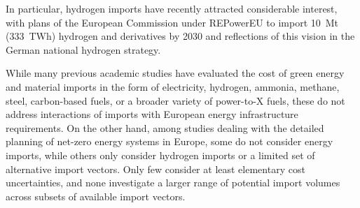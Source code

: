 

In particular, hydrogen imports have recently attracted considerable interest,
with plans of the European Commission under
\mbox{REPowerEU}\cite{europeancommissionRepowerEUPlan} to import 10~Mt (333~TWh)
hydrogen and derivatives by 2030 and reflections of this vision in the German
national hydrogen
strategy.\cite{bundesministeriumfuerwirtschaftundklimaschutzFortschreibungNationalen2023}



While many previous academic studies have evaluated the cost of green energy and material imports in the form of
electricity,\cite{lilliestamEnergySecurity2011,triebSolarElectricity2012,lilliestamVulnerabilityTerrorist2014,bogdanovNorthEastAsian2016,benaslaTransitionSustainable2019,reichenbergDeepDecarbonization2022}%
hydrogen,\cite{timmerbergHydrogenRenewables2019,ishimotoLargescaleProduction2020,brandleEstimatingLongterm2021,luxSupplyCurves2021,galvanExportingSunshine2022,collisDeterminingProduction2022,galimovaImpactInternational2023}
ammonia,\cite{nayak-lukeTechnoeconomicViability2020,armijoFlexibleProduction2020,galimovaFeasibilityGreen2023}
methane,\cite{luxSupplyCurves2021,agoraenergiewendeHydrogenImport2022}
steel,\cite{trollipHowGreen2022a,devlinRegionalSupply2022,lopezDefossilisedSteel2023}
carbon-based
fuels,\cite{fasihiLongTermHydrocarbon2017,sherwinElectrofuelSynthesis2021} or a
broader variety of power-to-X
fuels,\cite{vanderzwaanTimmermansDream2021,pfennigGlobalGISbased2022,irenaGlobalHydrogen2022,solerEFuelsTechno2022,hamppImportOptions2023,gengeSupplyCosts2023,galimovaGlobalTrading2023a}
these do not address interactions of imports with European energy infrastructure
requirements. On the other hand, among studies dealing with the detailed
planning of net-zero energy systems in Europe, some do not consider energy
imports,\cite{pickeringDiversityOptions2022,brownSynergiesSector2018,victoriaSpeedTechnological2022}
while others only consider hydrogen imports or a limited set of alternative
import
vectors.\cite{gilsInteractionHydrogen2021,seckHydrogenDecarbonization2022,wetzelGreenEnergy2023,kountourisUnifiedEuropean2023,neumannPotentialRole2023}
Only few consider at least elementary cost
uncertainties,\cite{frischmuthHydrogenSourcing2022} and none investigate a
larger range of potential import volumes across subsets of available import
vectors.


